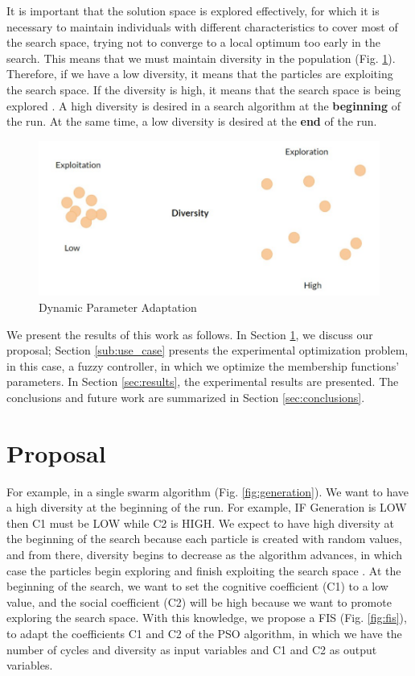 \documentclass[graybox]{svmult}
\begin{document}
It is important that the solution space is explored effectively, for which it is necessary to maintain individuals with different characteristics to cover most of the search space, trying not to converge to a local optimum too early in the search. This means that we must maintain diversity in the population (Fig. \ref{fig:diversity}). Therefore, if we have a low diversity, it means that the particles are exploiting the search space. If the diversity is high, it means that the search space is being explored \cite{wang2013diversity}. A high diversity is desired in a search algorithm at the \textbf{beginning} of the run. At the same time, a low diversity is desired at the \textbf{end} of the run.

\begin{figure} [htbp]
  \centering
  \includegraphics[angle=0,width=1\textwidth]{diversity}
  \caption{Dynamic Parameter Adaptation}
  \label{fig:diversity} 
\end{figure}

We present the results of this work as follows. In Section \ref{sec:proposal}, we discuss our proposal; Section \ref{sub:use_case} presents the experimental optimization problem, in this case, a fuzzy controller, in which we optimize the membership functions' parameters. In Section \ref{sec:results}, the experimental results are presented. The conclusions and future work are summarized in Section \ref{sec:conclusions}.

\section{Proposal}\label{sec:proposal}

For example, in a single swarm algorithm (Fig. \ref{fig:generation}). We want to have a high diversity at the beginning of the run. For example, IF Generation is LOW then C1 must be LOW while C2 is HIGH. We expect to have high diversity at the beginning of the search because each particle is created with random values, and from there, diversity begins to decrease as the algorithm advances, in which case the particles begin exploring and finish exploiting the search space \cite{cheng2011diversity}. At the beginning of the search, we want to set the cognitive coefficient (C1) to a low value, and the social coefficient (C2) will be high because we want to promote exploring the search space. With this knowledge, we propose a FIS (Fig. \ref{fig:fis}), to adapt the coefficients C1 and C2 of the PSO algorithm, in which we have the number of cycles
and diversity as input variables and C1 and C2 as output variables.
\end{document}
